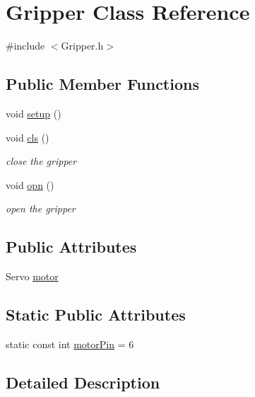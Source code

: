 \hypertarget{classGripper}{\section{Gripper Class Reference}
\label{classGripper}
}


{\ttfamily \#include $<$Gripper.\-h$>$}

\subsection*{Public Member Functions}
\begin{DoxyCompactItemize}
\item 
void \hyperlink{classGripper_a7eff7781d1109b4e988fa66c8141a6d7}{setup} ()
\item 
void \hyperlink{classGripper_ada511826dbf5abcdd12532ae725efeaf}{cls} ()
\begin{DoxyCompactList}\small\item\em close the gripper \end{DoxyCompactList}\item 
void \hyperlink{classGripper_ab4fa689ad3f08e97c7fcd10247965ff5}{opn} ()
\begin{DoxyCompactList}\small\item\em open the gripper \end{DoxyCompactList}\end{DoxyCompactItemize}
\subsection*{Public Attributes}
\begin{DoxyCompactItemize}
\item 
Servo \hyperlink{classGripper_ad72d0ae4ccd2be00ec3f303e7a0c1cc9}{motor}
\end{DoxyCompactItemize}
\subsection*{Static Public Attributes}
\begin{DoxyCompactItemize}
\item 
static const int \hyperlink{classGripper_ae12467d04d155401f1c6ba694b295f40}{motor\-Pin} = 6
\end{DoxyCompactItemize}


\subsection{Detailed Description}


